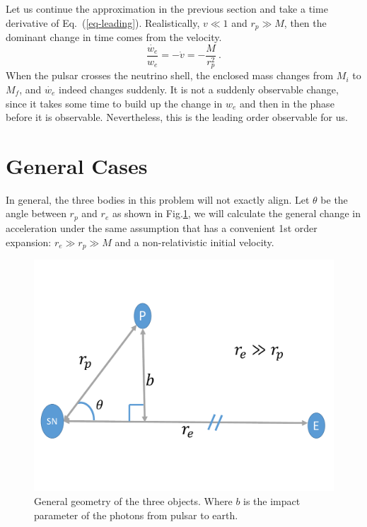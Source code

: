 \documentclass[aps,showpacs,onecolumn,floats,prd,superscriptaddress,nofootinbib]{revtex4}
\begin{document}
Let us continue the approximation in the previous section and take a time derivative of Eq.~(\ref{eq-leading}). Realistically, $v \ll1$ and $r_p\gg M$, then the dominant change in time comes from the velocity.
\begin{equation}
\frac{\dot{w_e}}{w_e} = -\dot{v} = -\frac{M}{r_p^2}~.
\label{eq-AccChange}
\end{equation}
When the pulsar crosses the neutrino shell, the enclosed mass changes from $M_i$ to $M_f$, and $\dot{w_e}$ indeed changes suddenly. It is not a suddenly observable change, since it takes some time to build up the change in $w_e$ and then in the phase before it is observable. Nevertheless, this is the leading order observable for us.

\section{General Cases}
\label{sec-3d}

In general, the three bodies in this problem will not exactly align. Let $\theta$ be the angle between $r_p$ and $r_e$ as shown in Fig.\ref{fig:3}, we will calculate the general change in acceleration under the same assumption that has a convenient 1st order expansion: $r_e\gg r_p\gg M$ and a non-relativistic initial velocity.

\begin{figure}[t]
\begin{center}
\includegraphics[scale = 0.3]{Image4.pdf}
\vspace{-8 mm}\caption{General geometry of the three objects. Where $b$ is the impact parameter of the photons from pulsar to earth. } 
\label{fig:3}
\end{center}
\end{figure}
\end{document}
